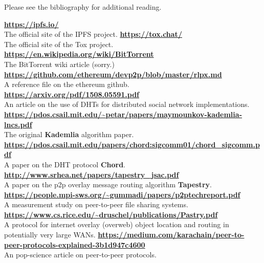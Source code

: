 \documentclass[12pt]{report}
\begin{document}
    Please see the bibliography for additional reading.
	
    \pagebreak




	\begin{thebibliography}{10}
            \textbf{\url{https://ipfs.io/}}\\
            The official site of the IPFS project.
            \textbf{\url{https://tox.chat/}}\\
            The official site of the Tox project.
            \textbf{\url{https://en.wikipedia.org/wiki/BitTorrent}}\\
            The BitTorrent wiki article (sorry.)
            \textbf{\url{https://github.com/ethereum/devp2p/blob/master/rlpx.md}}\\
            A reference file on the ethereum github.
            \textbf{\url{https://arxiv.org/pdf/1508.05591.pdf}}\\
            An article on the use of DHTs for distributed social network
            implementations.
		    \textbf{\url{https://pdos.csail.mit.edu/~petar/papers/maymounkov-kademlia-lncs.pdf}}\\
            The original \textbf{Kademlia} algorithm paper.
	    	\textbf{\url{https://pdos.csail.mit.edu/papers/chord:sigcomm01/chord_sigcomm.pdf}}\\
            A paper on the DHT protocol \textbf{Chord}.
	    	\textbf{\url{http://www.srhea.net/papers/tapestry_jsac.pdf}}\\
            A paper on the p2p overlay message routing algorithm \textbf{Tapestry}.
	    	\textbf{\url{https://people.mpi-sws.org/~gummadi/papers/p2ptechreport.pdf}}\\
            A measurement study on peer-to-peer file sharing systems.
	    	\textbf{\url{https://www.cs.rice.edu/~druschel/publications/Pastry.pdf}}\\
            A protocol for internet overlay (overweb) object location and
            routing in potentially very large WANs.
	    	\textbf{\url{https://medium.com/karachain/peer-to-peer-protocols-explained-3b1d947c4600}}\\
            An pop-science article on peer-to-peer protocols.
	\end{thebibliography}
\end{document}
